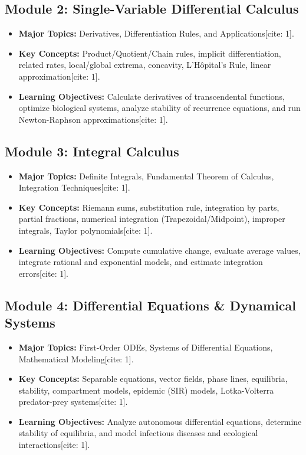 \documentclass[10pt, letterpaper]{article}
\begin{document}
\subsection{Module 2: Single-Variable Differential Calculus}
\begin{itemize}[leftmargin=*]
    \item \textbf{Major Topics:} Derivatives, Differentiation Rules, and Applications[cite: 1].
    \item \textbf{Key Concepts:} Product/Quotient/Chain rules, implicit differentiation, related rates, local/global extrema, concavity, L'H\^opital's Rule, linear approximation[cite: 1].
    \item \textbf{Learning Objectives:} Calculate derivatives of transcendental functions, optimize biological systems, analyze stability of recurrence equations, and run Newton-Raphson approximations[cite: 1].
\end{itemize}

\subsection{Module 3: Integral Calculus}
\begin{itemize}[leftmargin=*]
    \item \textbf{Major Topics:} Definite Integrals, Fundamental Theorem of Calculus, Integration Techniques[cite: 1].
    \item \textbf{Key Concepts:} Riemann sums, substitution rule, integration by parts, partial fractions, numerical integration (Trapezoidal/Midpoint), improper integrals, Taylor polynomials[cite: 1].
    \item \textbf{Learning Objectives:} Compute cumulative change, evaluate average values, integrate rational and exponential models, and estimate integration errors[cite: 1].
\end{itemize}

\subsection{Module 4: Differential Equations \& Dynamical Systems}
\begin{itemize}[leftmargin=*]
    \item \textbf{Major Topics:} First-Order ODEs, Systems of Differential Equations, Mathematical Modeling[cite: 1].
    \item \textbf{Key Concepts:} Separable equations, vector fields, phase lines, equilibria, stability, compartment models, epidemic (SIR) models, Lotka-Volterra predator-prey systems[cite: 1].
    \item \textbf{Learning Objectives:} Analyze autonomous differential equations, determine stability of equilibria, and model infectious diseases and ecological interactions[cite: 1].
\end{itemize}
\end{document}
